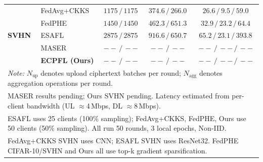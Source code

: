 \begin{table}[t]
{\begin{tabular}{ll c c c}
\multirow{5}{*}{\textbf{SVHN}}
& FedAvg+CKKS & $1175 \,/\, 1175$ & $374.6 \,/\, 266.0$ & $26.6 \,/\, 9.5 \,/\, 59.0$ \\
& FedPHE      & $1450 \,/\, 1450$ & $462.3 \,/\, 651.3$ & $32.9 \,/\, 23.2 \,/\, 64.4$ \\
& ESAFL       & $2875 \,/\, 2875$ & $916.6 \,/\, 650.7$ & $65.2 \,/\, 23.1 \,/\, 393.8$ \\
& MASER       & $-- \,/\, --$     & $-- \,/\, --$       & $-- \,/\, -- \,/\, --$ \\
& \textbf{ECPFL (Ours)} & $-- \,/\, --$ & $-- \,/\, --$ & $-- \,/\, -- \,/\, --$ \\

\bottomrule
\multicolumn{5}{l}{\scriptsize \textit{Note:} $N_{\mathrm{up}}$ denotes upload ciphertext batches per round; $N_{\mathrm{agg}}$ denotes aggregation operations per round.} \\
\multicolumn{5}{l}{\scriptsize MASER results pending; Ours SVHN pending. Latency estimated from per-client bandwidth (UL $\approx$4\,Mbps, DL $\approx$8\,Mbps).} \\
\multicolumn{5}{l}{\scriptsize ESAFL uses 25 clients (100\% sampling); FedAvg+CKKS, FedPHE, Ours use 50 clients (50\% sampling). All run 50 rounds, 3 local epochs, Non-IID.} \\
\multicolumn{5}{l}{\scriptsize FedAvg+CKKS SVHN uses CNN; ESAFL SVHN uses ResNet32. FedPHE CIFAR-10/SVHN and Ours all use top-k gradient sparsification.}
\end{tabular}
}
\end{table}
